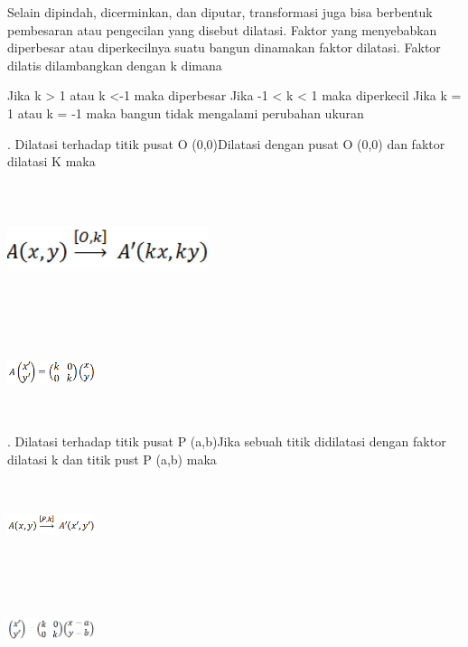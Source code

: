\documentclass[11pt,fleqn]{book} %
\begin{document}
\noindent
Selain dipindah, dicerminkan, dan diputar, transformasi juga bisa berbentuk pembesaran atau pengecilan yang disebut dilatasi. Faktor yang menyebabkan diperbesar atau diperkecilnya suatu bangun dinamakan faktor dilatasi. Faktor dilatis dilambangkan dengan k dimana


\noindent Jika k > 1 atau k <-1 maka diperbesar
\noindent Jika -1 < k < 1 maka diperkecil
\noindent Jika k = 1 atau k = -1 maka bangun tidak mengalami perubahan ukuran

. Dilatasi terhadap titik pusat O (0,0)Dilatasi dengan pusat O (0,0) dan faktor dilatasi K maka
\noindent
\begin{center}
	\noindent \includegraphics*[width=2.32in, height=1.48in, keepaspectratio=false, trim=0.00in 0.11in 0.00in 0.00in]{Pictures/10.PNG}
\end{center}

\noindent
\begin{center}
	\noindent \includegraphics*[width=1.01in, height=1.01in, keepaspectratio=false, trim=0.00in 0.11in 0.00in 0.00in]{Pictures/11.PNG}
\end{center}
. Dilatasi terhadap titik pusat P (a,b)Jika sebuah titik didilatasi dengan faktor dilatasi k dan titik pust P (a,b) maka
\noindent
\begin{center}
	\noindent \includegraphics*[width=1.01in, height=1.01in, keepaspectratio=false, trim=0.00in 0.11in 0.00in 0.00in]{Pictures/12.PNG}
\end{center}

\noindent
\begin{center}
	\noindent \includegraphics*[width=1.01in, height=1.01in, keepaspectratio=false, trim=0.00in 0.11in 0.00in 0.00in]{Pictures/13.PNG}
\end{center}
\end{document}
